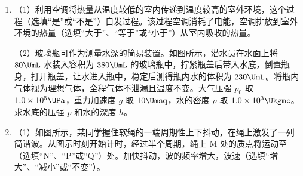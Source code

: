 \documentclass[\gkver]{gaokaozhenti}
\begin{document}
\begin{enumerate}
{（3）油滴 B 与油滴 A 合并后，新油滴的质量为 $2m_{0}$，新油滴所受电场力 $F' = \frac{Uq}{d} = \frac{m_{0}g(h_{1} + h_{2})}{h_{1}}$。若 $F' > 2m_{0}g$，即 $h_{2} > h_{1}$，可知 $v_{2} > v_{1}$，新油滴速度方向向上，设向上为正方向，根据动量守恒定律 $m_{0}v_{2} - m_{0}v_{1} = 2m_{0}v_{\text{共}}$，可得 $v_{\text{共}} > 0$。新油滴向上加速，达到平衡时 $2m_{0}g + k(2m_{0})^{\frac{1}{3}}v_{\text{共}} = F'$，解得速度大小为 $v_{\text{共}} = \frac{h_{2} - h_{1}}{\sqrt[3]{2}t}$，速度方向向上；

若 $F' < 2m_{0}g$，即 $h_{2} < h_{1}$，可知 $v_{2} < v_{1}$，设向下为正方向，根据动量守恒定律 $m_{0}v_{1} - m_{0}v_{2} = 2m_{0}v_{\text{共}}'$，可知 $v_{\text{共}}' > 0$。新油滴向下加速，达到平衡时 $2m_{0}g = F' + k(2m_{0})^{\frac{1}{3}}v_{\text{共}}'$，解得速度大小为 $v_{\text{共}}' = \frac{h_{1} - h_{2}}{\sqrt[3]{2}t}$，速度方向向下。
}

\item
（1）利用空调将热量从温度较低的室内传递到温度较高的室外环境，这个过程（选填“是”或“不是”）自发过程。该过程空调消耗了电能，空调排放到室外环境的热量（选填“大于”、“等于”或“小于”）从室内吸收的热量。

（2）玻璃瓶可作为测量水深的简易装置。如图所示，潜水员在水面上将 $80\UmL$ 水装入容积为 $380\UmL$ 的玻璃瓶中，拧紧瓶盖后带入水底，倒置瓶身，打开瓶盖，让水进入瓶中，稳定后测得瓶内水的体积为 $230\UmL$。将瓶内气体视为理想气体，全程气体不泄漏且温度不变。大气压强 $p_{0}$ 取 $1.0\times10^{5}\UPa$，重力加速度 $g$ 取 $10\Umsq$，水的密度 $\rho$ 取 $1.0\times10^{3}\Ukgmc$。求水底的压强 $p$ 和水的深度 $h$。



\item
（1）如图所示，某同学握住软绳的一端周期性上下抖动，在绳上激发了一列简谐波。从图示时刻开始计时，经过半个周期，绳上 M 处的质点将运动至（选填“N”、“P”或“Q”）处。加快抖动，波的频率增大，波速（选填“增大”、“减小”或“不变”）。


\end{enumerate}
\end{document}
